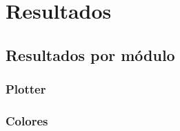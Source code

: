 \section{Resultados}

\subsection{Resultados por módulo}

\subsubsection{Plotter}





\subsubsection{Colores}





